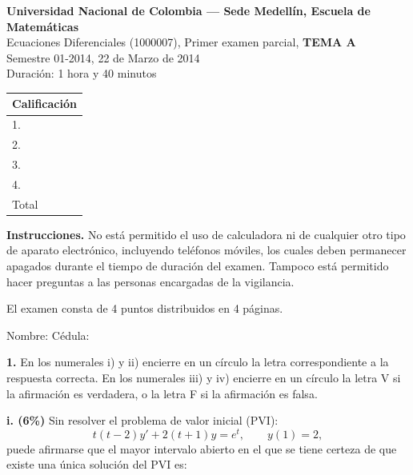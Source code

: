 \documentclass[11pt]{article}
\begin{document}
\noindent
\begin{minipage}[t]{0.68\linewidth}
  {\bfseries\large Universidad Nacional de Colombia --- Sede Medellín, Escuela de Matemáticas}\\[2pt]
  {\small Ecuaciones Diferenciales (1000007), Primer examen parcial, \textbf{TEMA A}}\\
  {\small Semestre 01-2014, 22 de Marzo de 2014}\\
  {\small Duración: 1 hora y 40 minutos}
\end{minipage}%
\hfill
\begin{minipage}[t]{0.28\linewidth}
  \raggedleft
  \begin{tabular}{|l|c|}
  \hline
  \multicolumn{2}{|c|}{Calificación} \\
  \hline
  1. & \\ \hline
  2. & \\ \hline
  3. & \\ \hline
  4. & \\ \hline
  Total & \\ \hline
  \end{tabular}
\end{minipage}

\vspace{6pt}
\noindent\textbf{Instrucciones.} No está permitido el uso de calculadora ni de cualquier otro tipo de aparato electrónico, incluyendo teléfonos móviles, los cuales deben permanecer apagados durante el tiempo de duración del examen. Tampoco está permitido hacer preguntas a las personas encargadas de la vigilancia.

\vspace{4pt}
\noindent El examen consta de 4 puntos distribuidos en 4 páginas.

\vspace{8pt}
\noindent Nombre: \makebox[0.45\linewidth]{\hrulefill} \hfill Cédula: \makebox[0.3\linewidth]{\hrulefill}

\vspace{6pt}
\noindent\textbf{1.} En los numerales i) y ii) encierre en un círculo la letra correspondiente a la respuesta correcta. En los numerales iii) y iv) encierre en un círculo la letra V si la afirmación es verdadera, o la letra F si la afirmación es falsa.

\vspace{0.3cm}
\noindent\textbf{i. (6\%)} Sin resolver el problema de valor inicial (PVI):
\[
t(t-2)y'+2(t+1)y=e^t, \qquad y(1)=2,
\]
puede afirmarse que el mayor intervalo abierto en el que se tiene certeza de que existe una única solución del PVI es:
\end{document}
